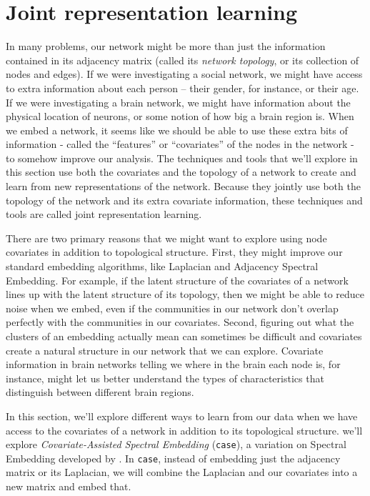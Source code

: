 \section{Joint representation learning}
\label{sec:ch6:joint}

In many problems, our network might be more than just the information contained in its adjacency matrix (called its \textit{network topology}, or its collection of nodes and edges). If we were investigating a social network, we might have access to extra information about each person -- their gender, for instance, or their age. If we were investigating a brain network, we might have information about the physical location of neurons, or some notion of how big a brain region is. When we embed a network, it seems like we should be able to use these extra bits of information - called the ``features'' or ``covariates'' of the nodes in the network - to somehow improve our analysis. The techniques and tools that we'll explore in this section use both the covariates and the topology of a network to create and learn from new representations of the network. Because they jointly use both the topology of the network and its extra covariate information, these techniques and tools are called joint representation learning.

There are two primary reasons that we might want to explore using node covariates in addition to topological structure. First, they might improve our standard embedding algorithms, like Laplacian and Adjacency Spectral Embedding. For example, if the latent structure of the covariates of a network lines up with the latent structure of its topology, then we might be able to reduce noise when we embed, even if the communities in our network don't overlap perfectly with the communities in our covariates. Second, figuring out what the clusters of an embedding actually mean can sometimes be difficult and covariates create a natural structure in our network that we can explore. Covariate information in brain networks telling we where in the brain each node is, for instance, might let us better understand the types of characteristics that distinguish between different brain regions.

In this section, we'll explore different ways to learn from our data when we have access to the covariates of a network in addition to its topological structure. we'll explore \textit{Covariate-Assisted Spectral Embedding} (\texttt{case}), a variation on Spectral Embedding developed by \cite{Binkiewicz2017Jun}. In \texttt{case}, instead of embedding just the adjacency matrix or its Laplacian, we will combine the Laplacian and our covariates into a new matrix and embed that.

